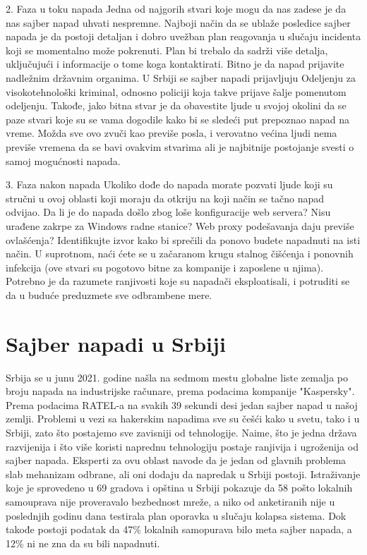 \documentclass[a4paper]{article}
\begin{document}
{2. Faza u toku napada
Jedna od najgorih stvari koje mogu da nas zadese je da nas sajber napad uhvati nespremne. Najboji način da se ublaže posledice sajber napada je da postoji detaljan i dobro uvežban plan reagovanja u slučaju incidenta koji se momentalno može pokrenuti. Plan bi trebalo da sadrži više detalja, uključujući i informacije o tome koga kontaktirati. Bitno je da napad prijavite nadležnim državnim organima. U Srbiji se sajber napadi prijavljuju Odeljenju za visokotehnološki kriminal, odnosno policiji koja takve prijave šalje pomenutom odeljenju. Takođe, jako bitna stvar je da obavestite ljude u svojoj okolini da se paze stvari koje su se vama dogodile kako bi se sledeći put prepoznao napad na vreme. Možda sve ovo zvuči kao previše posla, i verovatno većina ljudi nema previše vremena da se bavi ovakvim stvarima ali je najbitnije postojanje svesti o samoj mogućnosti napada.

3. Faza nakon napada
Ukoliko dođe do napada morate pozvati ljude koji su stručni u ovoj oblasti koji moraju da otkriju na koji način se tačno napad odvijao. Da li je do napada došlo zbog loše konfiguracije web servera? Nisu urađene zakrpe za Windows radne stanice? Web proxy podešavanja daju previše ovlašćenja? Identifikujte izvor kako bi sprečili da ponovo budete napadnuti na isti način. U suprotnom, naći ćete se u začaranom krugu stalnog čišćenja i ponovnih infekcija (ove stvari su pogotovo bitne za kompanije i zaposlene u njima). Potrebno je da razumete ranjivosti koje su napadači eksploatisali, i potruditi se da u buduće preduzmete sve odbrambene mere.

\section{Sajber napadi u Srbiji}

Srbija se u junu 2021. godine našla na sedmom mestu globalne liste zemalja po broju napada na industrijske računare, prema podacima kompanije "Kaspersky". Prema podacima RATEL-a na svakih 39 sekundi desi jedan sajber napad u našoj zemlji.
Problemi u vezi sa hakerskim napadima sve su češći kako u svetu, tako i u Srbiji, zato što postajemo sve zavisniji od tehnologije. Naime, što je jedna država razvijenija i što više koristi naprednu tehnologiju postaje ranjivija i ugroženija od sajber napada.
Eksperti za ovu oblast navode da je jedan od glavnih problema slab mehanizam odbrane, ali  oni dodaju da napredak u Srbiji postoji.
Istraživanje koje je sprovedeno u 69 gradova i opština u Srbiji pokazuje da 58 pošto lokalnih samouprava nije proveravalo bezbednost mreže, a niko od anketiranih nije u poslednjih godinu dana testirala plan oporavka u slučaju kolapsa sistema. Dok takođe postoji podatak da 47\% lokalnih samopurava bilo meta sajber napada, a 12\% ni ne zna da su bili napadnuti.
  

}
\end{document}
